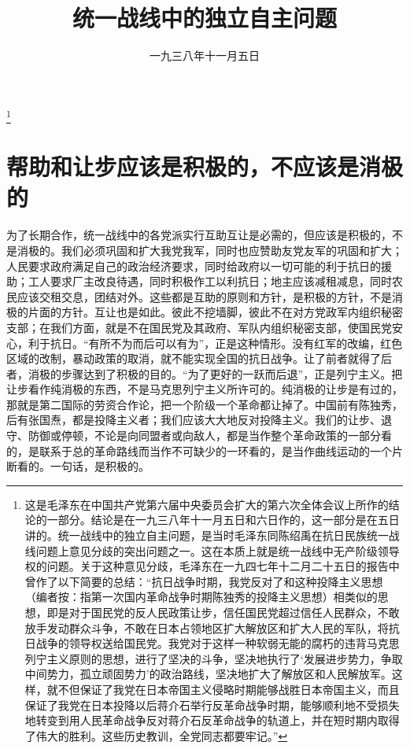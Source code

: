 
\title{统一战线中的独立自主问题}
\date{一九三八年十一月五日}
\thanks{这是毛泽东在中国共产党第六届中央委员会扩大的第六次全体会议上所作的结论的一部分。结论是在一九三八年十一月五日和六日作的，这一部分是在五日讲的。统一战线中的独立自主问题，是当时毛泽东同陈绍禹在抗日民族统一战线问题上意见分歧的突出问题之一。这在本质上就是统一战线中无产阶级领导权的问题。关于这种意见分歧，毛泽东在一九四七年十二月二十五日的报告中曾作了以下简要的总结：“抗日战争时期，我党反对了和这种投降主义思想（编者按：指第一次国内革命战争时期陈独秀的投降主义思想）相类似的思想，即是对于国民党的反人民政策让步，信任国民党超过信任人民群众，不敢放手发动群众斗争，不敢在日本占领地区扩大解放区和扩大人民的军队，将抗日战争的领导权送给国民党。我党对于这样一种软弱无能的腐朽的违背马克思列宁主义原则的思想，进行了坚决的斗争，坚决地执行了‘发展进步势力，争取中间势力，孤立顽固势力’的政治路线，坚决地扩大了解放区和人民解放军。这样，就不但保证了我党在日本帝国主义侵略时期能够战胜日本帝国主义，而且保证了我党在日本投降以后蒋介石举行反革命战争时期，能够顺利地不受损失地转变到用人民革命战争反对蒋介石反革命战争的轨道上，并在短时期内取得了伟大的胜利。这些历史教训，全党同志都要牢记。”}
\maketitle


\section{帮助和让步应该是积极的，不应该是消极的}

为了长期合作，统一战线中的各党派实行互助互让是必需的，但应该是积极的，不是消极的。我们必须巩固和扩大我党我军，同时也应赞助友党友军的巩固和扩大；人民要求政府满足自己的政治经济要求，同时给政府以一切可能的利于抗日的援助；工人要求厂主改良待遇，同时积极作工以利抗日；地主应该减租减息，同时农民应该交租交息，团结对外。这些都是互助的原则和方针，是积极的方针，不是消极的片面的方针。互让也是如此。彼此不挖墙脚，彼此不在对方党政军内组织秘密支部；在我们方面，就是不在国民党及其政府、军队内组织秘密支部，使国民党安心，利于抗日。“有所不为而后可以有为”，正是这种情形。没有红军的改编，红色区域的改制，暴动政策的取消，就不能实现全国的抗日战争。让了前者就得了后者，消极的步骤达到了积极的目的。“为了更好的一跃而后退”，正是列宁主义。把让步看作纯消极的东西，不是马克思列宁主义所许可的。纯消极的让步是有过的，那就是第二国际的劳资合作论，把一个阶级一个革命都让掉了。中国前有陈独秀，后有张国焘，都是投降主义者；我们应该大大地反对投降主义。我们的让步、退守、防御或停顿，不论是向同盟者或向敌人，都是当作整个革命政策的一部分看的，是联系于总的革命路线而当作不可缺少的一环看的，是当作曲线运动的一个片断看的。一句话，是积极的。

